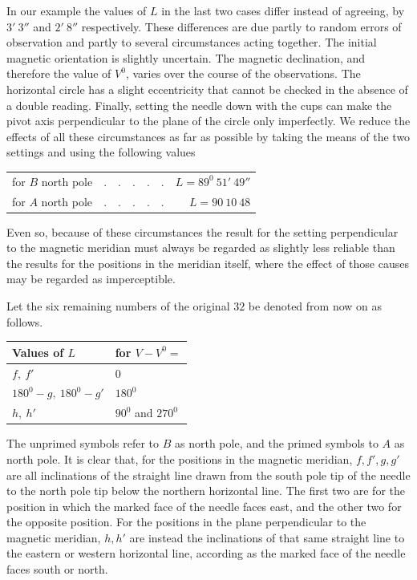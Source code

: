 In our example the values of $L$ in the last two cases differ instead of agreeing, by $3'\ 3''$ and $2'\ 8''$ respectively. These differences are due partly to random errors of observation and partly to several circumstances acting together. The initial magnetic orientation is slightly uncertain. The magnetic declination, and therefore the value of $V^0$, varies over the course of the observations. The horizontal circle has a slight eccentricity that cannot be checked in the absence of a double reading. Finally, setting the needle down with the cups can make the pivot axis perpendicular to the plane of the circle only imperfectly. We reduce the effects of all these circumstances as far as possible by taking the means of the two settings and using the following values


\begin{center}
\begin{tabular}{llr}
for $B$ north pole&$.\quad.\quad.\quad.\quad.$&$L=89^0\ 51'\ 49''$\\
for $A$ north pole&$.\quad.\quad.\quad.\quad.$&$L=90\ 10\ 48$
\end{tabular}
\end{center}
Even so, because of these circumstances the result for the setting perpendicular to the magnetic meridian must always be regarded as slightly less reliable than the results for the positions in the meridian itself, where the effect of those causes may be regarded as imperceptible.

Let the six remaining numbers of the original $32$ be denoted from now on as follows.
\begin{center}
\begin{tabular}{l|l}
Values of $L$&for $V-V^0=$\\\hline
$f,\ f'$&$0$\\
$180^0-g,\ 180^0-g'$&$180^0$\\
$h,\ h'$&$90^0$ and $270^0$
\end{tabular}
\end{center}
The unprimed symbols refer to $B$ as north pole, and the primed symbols to $A$ as north pole. It is clear that, for the positions in the magnetic meridian, $f,f',g,g'$ are all inclinations of the straight line drawn from the south pole tip of the needle to the north pole tip below the northern horizontal line. The first two are for the position in which the marked face of the needle faces east, and the other two for the opposite position. For the positions in the plane perpendicular to the magnetic meridian, $h,h'$ are instead the inclinations of that same straight line to the eastern or western horizontal line, according as the marked face of the needle faces south or north.

